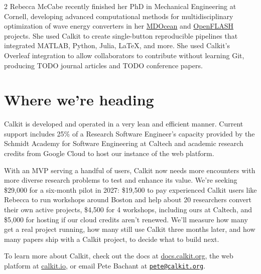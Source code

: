 \documentclass[10pt]{article}
\providecommand{\ckvalue}[4]{#2}
\begin{document}
\begin{multicols}{2}
Rebecca McCabe recently finished her PhD in Mechanical Engineering at
Cornell, developing advanced computational methods for multidisciplinary
optimization of wave energy converters in her
\href{https://github.com/symbiotic-engineering/MDOcean}{MDOcean} and
\href{https://github.com/symbiotic-engineering/OpenFLASH}{OpenFLASH}
projects. She used Calkit to create single-button reproducible pipelines
that integrated MATLAB, Python, Julia, LaTeX, and more. She used
Calkit's Overleaf integration to allow collaborators to contribute
without learning Git, producing TODO journal articles and TODO
conference papers.

\section{Where we're heading}\label{where-were-heading}

Calkit is developed and operated in a very lean and efficient manner.
Current support includes 25\% of a Research Software Engineer's capacity
provided by the Schmidt Academy for Software Engineering at Caltech and
academic research credits from Google Cloud to host our instance of the
web platform.

With an MVP serving a handful of users, Calkit now needs more encounters
with more diverse research problems to test and enhance its value. We're
seeking \$\ckvalue{total}{29,000}{results/2027-budget.json}{budget-2027}
for a six-month pilot in 2027:
\$\ckvalue{by\_category.fellow}{19,500}{results/2027-budget.json}{budget-2027}
to pay experienced Calkit users like Rebecca to run workshops around
Boston and help about
\ckvalue{projects\_supported}{20}{results/2027-budget.json}{budget-2027}
researchers convert their own active projects,
\$\ckvalue{by\_category.workshops}{4,500}{results/2027-budget.json}{budget-2027}
for \ckvalue{workshops}{4}{results/2027-budget.json}{budget-2027}
workshops, including ours at Caltech, and
\$\ckvalue{by\_category.hosting}{5,000}{results/2027-budget.json}{budget-2027}
for hosting if our cloud credits aren't renewed. We'll measure how many
get a real project running, how many still use Calkit three months
later, and how many papers ship with a Calkit project, to decide what to
build next.

To learn more about Calkit, check out the docs at
\href{https://docs.calkit.org}{docs.calkit.org}, the web platform at
\href{https://calkit.io}{calkit.io}, or email Pete Bachant at
\href{mailto:pete@calkit.org}{\nolinkurl{pete@calkit.org}}.
\end{multicols}
\end{document}
